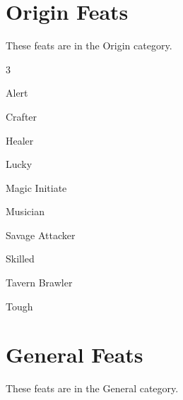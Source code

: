 \documentclass[10pt,a4paper,twoside,bg=print,twocolumn,openany,nodeprecatedcode]{dndbook}
\begin{document}
\section{Origin Feats}
These feats are in the Origin category.


\begin{description}
\begin{multicols}{3}
\item Alert
\item Crafter
\item Healer
\item Lucky
\item Magic Initiate
\item Musician
\item Savage Attacker
\item Skilled
\item Tavern Brawler
\item Tough
\end{multicols}

\end{description}

\section{General Feats}
These feats are in the General category.
\end{document}
